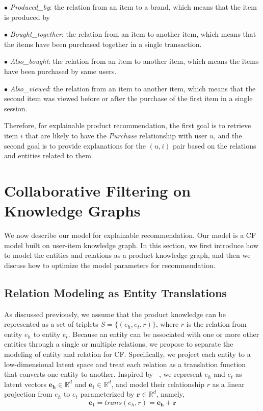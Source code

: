 \documentclass[algorithms,article,accept,moreauthors,pdftex,10pt,a4paper]{Definitions/mdpi}
\begin{document}
$\bullet$ \textit{Produced\_by}: the relation from an item to a brand, which means that the item is produced by 

$\bullet$ \textit{Bought\_together}: the relation from an item to another item, which means that the items have been purchased together in a single transaction.

$\bullet$ \textit{Also\_bought}: the relation from an item to another item, which means the items have been purchased by same users.

$\bullet$ \textit{Also\_viewed}: the relation from an item to another item, which means that the second item was viewed before or after the purchase of the first item in a single session.

\vspace{6 pt} Therefore, for explainable product recommendation, the first goal is to retrieve item $i$ that are likely to have the \textit{Purchase}
 relationship with user $u$, and the second goal is to provide explanations for the $(u,i)$ pair based on the relations and entities related to them.









\section{Collaborative Filtering on Knowledge Graphs}\label{sec:model}

We now describe our model for explainable recommendation.
Our model is a CF model built on user-item knowledge graph.
In this section, we first introduce how to model the entities and relations as a product knowledge graph, and then we discuss how to optimize the model parameters for recommendation. 





\subsection{Relation Modeling as Entity Translations}\label{sec:trans}

As discussed previously, we assume that the product knowledge can be represented as a set of triplets $S = \{(e_h, e_t, r)\}$, where $r$ is the relation from entity $e_h$ to entity $e_t$.
Because an entity can be associated with one or more other entities through a single or multiple relations, we propose to separate the modeling of entity and relation for CF.
Specifically, we project each entity to a low-dimensional latent space and treat each relation as a translation function that converts one entity to another.
Inspired by ~\cite{bordes2013translating}, we represent $e_h$ and $e_t$ as latent vectors $\bm{e_h} \in \mathbb{R}^{d}$ and $\bm{e_t} \in \mathbb{R}^{d}$, and model their relationship $r$ as a linear projection from $e_h$ to $e_t$ parameterized by $\bm{r} \in \mathbb{R}^{d}$, namely,
\begin{equation}
\bm{e_t} = trans(e_h, r) = \bm{e_h} + \bm{r} 
\label{equ:trans}
\end{equation}
\end{document}
